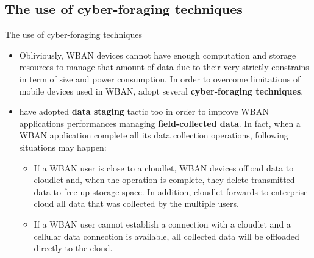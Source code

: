 \documentclass[10pt]{beamer}
\begin{document}
\subsection{The use of cyber-foraging techniques}
\begin{frame}{The use of cyber-foraging techniques} 

\begin{itemize}
\item Obliviously, WBAN devices cannot have enough computation and storage resources to manage that amount of data due to their very strictly constrains in term of size and power consumption. In order to overcome limitations of mobile devices used in WBAN, \citet{MSAReport} adopt several \textbf{cyber-foraging techniques}.

\item \citet{MSAReport} have adopted \textbf{data staging} tactic too in order to improve WBAN applications performances managing \textbf{field-collected data}. In fact, when a WBAN application complete all its data collection operations, following situations may happen:

\begin{itemize}
\item If a WBAN user is close to a cloudlet, WBAN devices offload data to cloudlet and, when the operation is complete, they delete transmitted data to free up storage space. In addition, cloudlet forwards to enterprise cloud all data that was collected by the multiple users.

\item If a WBAN user cannot establish a connection with a cloudlet and a cellular data connection is available, all collected data will be offloaded directly to the cloud.
\end{itemize}



\end{itemize}

\end{frame} 
\end{document}
